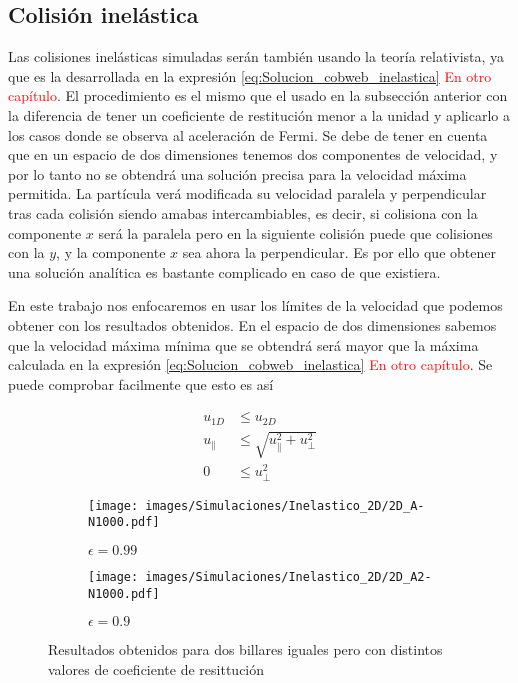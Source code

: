 \subsection{Colisión inelástica}

Las colisiones inelásticas simuladas serán también usando la teoría relativista, ya que es la desarrollada en la expresión \ref{eq:Solucion_cobweb_inelastica} \textcolor{red}{En otro capítulo}. El procedimiento es el mismo que el usado en la subsección anterior con la diferencia de tener un coeficiente de restitución menor a la unidad y aplicarlo a los casos donde se observa al aceleración de Fermi. Se debe de tener en cuenta que en un espacio de dos dimensiones tenemos dos componentes de velocidad, y por lo tanto no se obtendrá una solución precisa para la velocidad máxima permitida. La partícula verá modificada su velocidad paralela y perpendicular tras cada colisión siendo amabas intercambiables, es decir, si colisiona con la componente \( x \) será la paralela pero en la siguiente colisión puede que colisiones con la \( y \), y la componente \( x \) sea ahora la perpendicular. Es por ello que obtener una solución analítica es bastante complicado en caso de que existiera. 

\vspace{3mm}

En este trabajo nos enfocaremos en usar los límites de la velocidad que podemos obtener con los resultados obtenidos. En el espacio de dos dimensiones sabemos que la velocidad máxima mínima que se obtendrá será mayor que la máxima calculada en la expresión \ref{eq:Solucion_cobweb_inelastica} \textcolor{red}{En otro capítulo}. Se puede comprobar facilmente que esto es así

\begin{align}
    u_{1D} &\leq u_{2D} \nonumber\\
    u_{\parallel} &\leq \sqrt{u_\parallel^2 + u_\perp^2}\\
     0 &\leq u_\perp^2 \nonumber
\end{align}

\begin{figure}[H]
    \begin{subfigure}[b]{0.5\textwidth}
        \centering
        \texttt{[image: images/Simulaciones/Inelastico\_2D/2D\_A-N1000.pdf]}
        \caption{\( \epsilon = 0.99 \)}
    \end{subfigure}
    \hfill
    \begin{subfigure}[b]{0.5\textwidth}
        \centering
        \texttt{[image: images/Simulaciones/Inelastico\_2D/2D\_A2-N1000.pdf]}
        \caption{\( \epsilon = 0.9 \)}
    \end{subfigure}
    \caption{Resultados obtenidos para dos billares iguales pero con distintos valores de coeficiente de resittución}
    \label{fig:2DR_A-N1000_Ine}
\end{figure}

